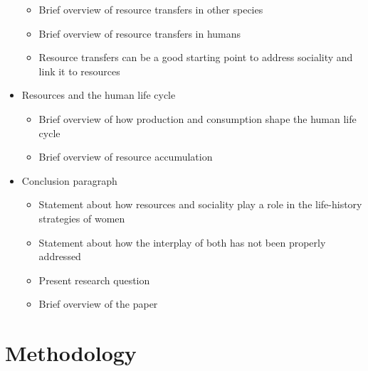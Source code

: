 \documentclass{article}
\begin{document}
\begin{itemize}
\begin{itemize}
        \item Brief overview of resource transfers in other species
        \item Brief overview of resource transfers in humans
        \item Resource transfers can be a good starting point to address sociality and link it to resources
    \end{itemize}
    \item Resources and the human life cycle
    \begin{itemize}
        \item Brief overview of how production and consumption shape the human life cycle
        \item Brief overview of resource accumulation
    \end{itemize}
    \item Conclusion paragraph
    \begin{itemize}
        \item Statement about how resources and sociality play a role in the life-history strategies of women
        \item Statement about how the interplay of both has not been properly addressed
        \item Present research question
        \item Brief overview of the paper
    \end{itemize}
\end{itemize}
\section{Methodology}
\end{document}
